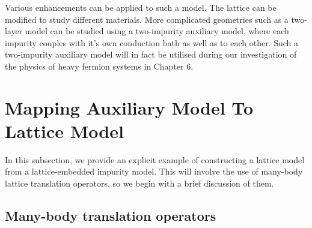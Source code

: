 Various enhancements can be applied to such a model. The lattice can be modified to study different materials. More complicated geometries such as a two-layer model can be studied using a two-impurity auxiliary model, where each impurity couples with it's own conduction bath as well as to each other. Such a two-impurity auxiliary model will in fact be utilised during our investigation of the physics of heavy fermion systems in Chapter 6.

\section{Mapping Auxiliary Model To Lattice Model}
In this subsection, we provide an explicit example of constructing a lattice model from a lattice-embedded impurity model. This will involve the use of many-body lattice translation operators, so we begin with a brief discussion of them.

\subsection{Many-body translation operators}\label{translationOperators}

